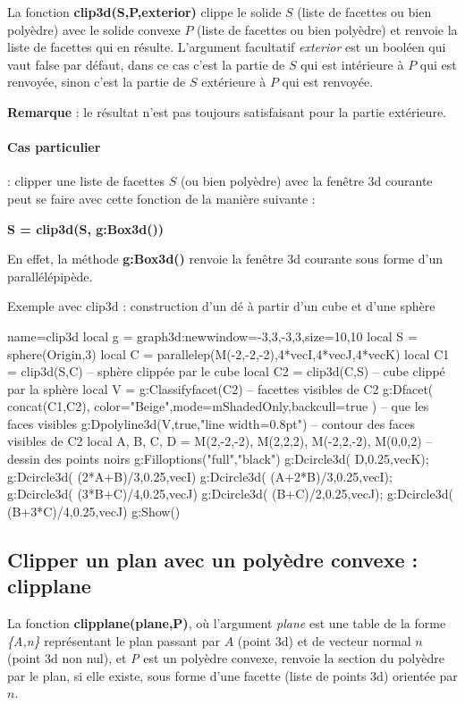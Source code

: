 La fonction \textbf{clip3d(S,P,exterior)} clippe le solide $S$ (liste de facettes ou bien polyèdre) avec le solide convexe $P$ (liste de facettes ou bien polyèdre) et renvoie la liste de facettes qui en résulte. L'argument facultatif \emph{exterior} est un booléen qui vaut false par défaut, dans ce cas c'est la partie de $S$ qui est intérieure à $P$ qui est renvoyée, sinon c'est la partie de $S$ extérieure à $P$ qui est renvoyée.\par
\textbf{Remarque} : le résultat n'est pas toujours satisfaisant pour la partie extérieure.

\paragraph{Cas particulier} : clipper une liste de facettes $S$ (ou bien polyèdre) avec la fenêtre 3d courante peut se faire avec cette fonction de la manière suivante :

\begin{center}
\textbf{S = clip3d(S, g:Box3d())}
\end{center}

En effet, la méthode \textbf{g:Box3d()} renvoie la fenêtre 3d courante sous forme d'un parallélépipède.

\begin{demo}[clip3d]{Exemple avec clip3d : construction d'un dé à partir d'un cube et d'une sphère}
\begin{luadraw}{name=clip3d}
local g = graph3d:new{window={-3,3,-3,3},size={10,10}}
local S = sphere(Origin,3)
local C = parallelep(M(-2,-2,-2),4*vecI,4*vecJ,4*vecK)
local C1 = clip3d(S,C) -- sphère clippée par le cube
local C2 = clip3d(C,S) -- cube clippé par la sphère
local V = g:Classifyfacet(C2) -- facettes visibles de C2
g:Dfacet( concat(C1,C2), {color="Beige",mode=mShadedOnly,backcull=true} ) -- que les faces visibles
g:Dpolyline3d(V,true,"line width=0.8pt") -- contour des faces visibles de C2
local A, B, C, D = M(2,-2,-2), M(2,2,2), M(-2,2,-2), M(0,0,2) -- dessin des points noirs
g:Filloptions("full","black")
g:Dcircle3d( D,0.25,vecK); g:Dcircle3d( (2*A+B)/3,0.25,vecI)
g:Dcircle3d( (A+2*B)/3,0.25,vecI); g:Dcircle3d( (3*B+C)/4,0.25,vecJ)
g:Dcircle3d( (B+C)/2,0.25,vecJ); g:Dcircle3d( (B+3*C)/4,0.25,vecJ)
g:Show()            
\end{luadraw}
\end{demo}

\subsection{Clipper un plan avec un polyèdre convexe : clipplane}

La fonction \textbf{clipplane(plane,P)}, où l'argument \emph{plane} est une table de la forme \emph{\{A,n\}} représentant le plan passant par $A$ (point 3d) et de vecteur normal $n$ (point 3d non nul), et \emph{P} est un polyèdre convexe, renvoie la section du polyèdre par le plan, si elle existe, sous forme d'une facette (liste de points 3d) orientée par $n$.
